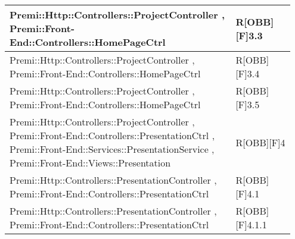 \begin{table}[h]
\begin{center}
\begin{tabular}{|p{0.75\linewidth}|p{0.2\linewidth}|}
		\midrule
			Premi::Http::Controllers::ProjectController , Premi::Front-End::Controllers::HomePageCtrl & R[OBB][F]3.3 \\
		\midrule
			Premi::Http::Controllers::ProjectController , Premi::Front-End::Controllers::HomePageCtrl & R[OBB][F]3.4 \\
		\midrule
			Premi::Http::Controllers::ProjectController , Premi::Front-End::Controllers::HomePageCtrl & R[OBB][F]3.5 \\
		\midrule
			Premi::Http::Controllers::ProjectController , Premi::Front-End::Controllers::PresentationCtrl , Premi::Front-End::Services::PresentationService , Premi::Front-End::Views::Presentation & R[OBB][F]4 \\
		\midrule
			Premi::Http::Controllers::PresentationController , Premi::Front-End::Controllers::PresentationCtrl & R[OBB][F]4.1 \\
		\midrule
			Premi::Http::Controllers::PresentationController , Premi::Front-End::Controllers::PresentationCtrl & R[OBB][F]4.1.1 \\

\bottomrule
\end{tabular}
\end{center}
\end{table}


